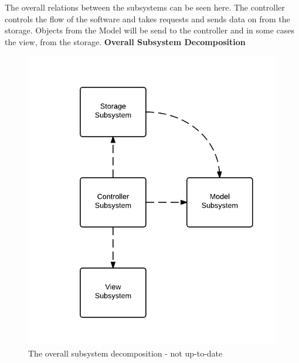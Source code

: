 The overall relations between the subsystems can be seen here. The controller controls the flow of the software and takes requests and sends data on from the storage. Objects from the Model will be send to the controller and in some cases the view, from the storage.\newpage
\textbf{Overall Subsystem Decomposition}\\
\begin{figure}[h!]
	\centering
		\includegraphics[scale=0.8]{OverallSubsystemDecomposition}
	\caption{The overall subsystem decomposition - not up-to-date}
  \label{fig:OverallSubsystemDecomposition}
\end{figure}

